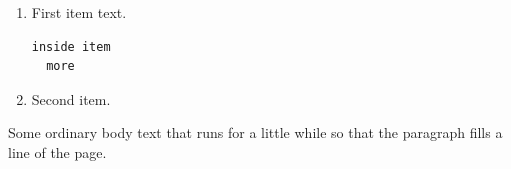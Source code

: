\documentclass{article}
\begin{document}
\begin{enumerate}
\item First item text.
\begin{verbatim}
inside item
  more
\end{verbatim}
\item Second item.
\end{enumerate}

Some ordinary body text that runs for a little while so that the paragraph fills a line of the page.
\end{document}
